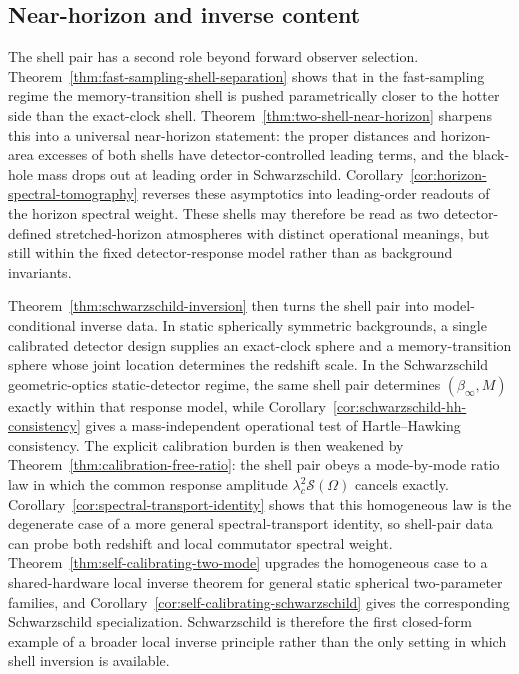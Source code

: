 \subsection{Near-horizon and inverse content}

The shell pair has a second role beyond forward observer selection. Theorem~\ref{thm:fast-sampling-shell-separation} shows that in the fast-sampling regime the memory-transition shell is pushed parametrically closer to the hotter side than the exact-clock shell. Theorem~\ref{thm:two-shell-near-horizon} sharpens this into a universal near-horizon statement: the proper distances and horizon-area excesses of both shells have detector-controlled leading terms, and the black-hole mass drops out at leading order in Schwarzschild. Corollary~\ref{cor:horizon-spectral-tomography} reverses these asymptotics into leading-order readouts of the horizon spectral weight. These shells may therefore be read as two detector-defined stretched-horizon atmospheres with distinct operational meanings, but still within the fixed detector-response model rather than as background invariants.

Theorem~\ref{thm:schwarzschild-inversion} then turns the shell pair into model-conditional inverse data. In static spherically symmetric backgrounds, a single calibrated detector design supplies an exact-clock sphere and a memory-transition sphere whose joint location determines the redshift scale. In the Schwarzschild geometric-optics static-detector regime, the same shell pair determines $(\beta_\infty,M)$ exactly within that response model, while Corollary~\ref{cor:schwarzschild-hh-consistency} gives a mass-independent operational test of Hartle--Hawking consistency. The explicit calibration burden is then weakened by Theorem~\ref{thm:calibration-free-ratio}: the shell pair obeys a mode-by-mode ratio law in which the common response amplitude $\lambda_c^2\mathcal S(\Omega)$ cancels exactly. Corollary~\ref{cor:spectral-transport-identity} shows that this homogeneous law is the degenerate case of a more general spectral-transport identity, so shell-pair data can probe both redshift and local commutator spectral weight. Theorem~\ref{thm:self-calibrating-two-mode} upgrades the homogeneous case to a shared-hardware local inverse theorem for general static spherical two-parameter families, and Corollary~\ref{cor:self-calibrating-schwarzschild} gives the corresponding Schwarzschild specialization. Schwarzschild is therefore the first closed-form example of a broader local inverse principle rather than the only setting in which shell inversion is available.

